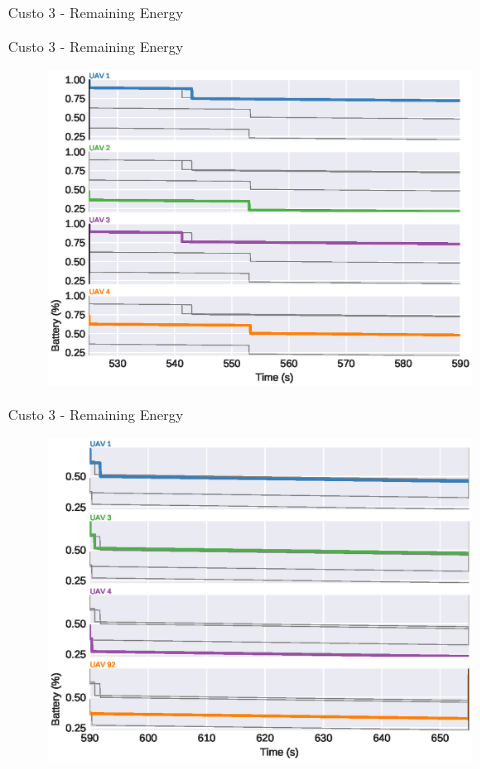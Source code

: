 \begin{frame}{Custo 3 - Remaining Energy}
\begin{figure}[!htb]
                    \end{figure}
                \end{frame}\begin{frame}{Custo 3 - Remaining Energy}
                    \begin{figure}[!htb]
                        \includegraphics[width=\textwidth]{custo_3/uav_remaining_energy_590.eps}
                    \end{figure}
                \end{frame}\begin{frame}{Custo 3 - Remaining Energy}
                    \begin{figure}[!htb]
                        \includegraphics[width=\textwidth]{custo_3/uav_remaining_energy_655.eps}

\end{figure}
\end{frame}

